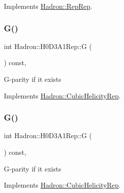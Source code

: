 Implements \mbox{\hyperlink{structHadron_1_1RepRep_a92c8802e5ed7afd7da43ccfd5b7cd92b}{Hadron\+::\+Rep\+Rep}}.

\mbox{\label{structHadron_1_1H0D3A1Rep_a654d6957eca34719885b77918fb3ea4d}} 
\subsubsection{\texorpdfstring{G()}{G()}\hspace{0.1cm}{\footnotesize\ttfamily [1/3]}}
{\footnotesize\ttfamily int Hadron\+::\+H0\+D3\+A1\+Rep\+::G (\begin{DoxyParamCaption}{ }\end{DoxyParamCaption}) const\hspace{0.3cm}{\ttfamily [inline]}, {\ttfamily [virtual]}}

G-\/parity if it exists 

Implements \mbox{\hyperlink{structHadron_1_1CubicHelicityRep_a50689f42be1e6170aa8cf6ad0597018b}{Hadron\+::\+Cubic\+Helicity\+Rep}}.

\mbox{\label{structHadron_1_1H0D3A1Rep_a654d6957eca34719885b77918fb3ea4d}} 
\subsubsection{\texorpdfstring{G()}{G()}\hspace{0.1cm}{\footnotesize\ttfamily [2/3]}}
{\footnotesize\ttfamily int Hadron\+::\+H0\+D3\+A1\+Rep\+::G (\begin{DoxyParamCaption}{ }\end{DoxyParamCaption}) const\hspace{0.3cm}{\ttfamily [inline]}, {\ttfamily [virtual]}}

G-\/parity if it exists 

Implements \mbox{\hyperlink{structHadron_1_1CubicHelicityRep_a50689f42be1e6170aa8cf6ad0597018b}{Hadron\+::\+Cubic\+Helicity\+Rep}}.

\mbox{\label{structHadron_1_1H0D3A1Rep_a654d6957eca34719885b77918fb3ea4d}} 
